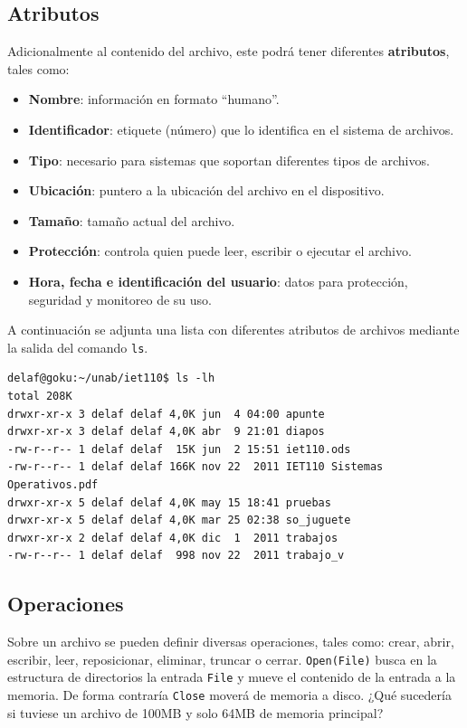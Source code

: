 \subsection{Atributos}

Adicionalmente al contenido del archivo, este podrá tener diferentes
\textbf{atributos}, tales como:

\begin{itemize}
	\item \textbf{Nombre}: información en formato ``humano''.
	\item \textbf{Identificador}: etiquete (número) que lo identifica en el
sistema de archivos.
	\item \textbf{Tipo}: necesario para sistemas que soportan diferentes
tipos de archivos.
	\item \textbf{Ubicación}: puntero a la ubicación del archivo en el
dispositivo.
	\item \textbf{Tamaño}: tamaño actual del archivo.
	\item \textbf{Protección}: controla quien puede leer, escribir o
ejecutar el archivo.
	\item \textbf{Hora, fecha e identificación del usuario}: datos para
protección, seguridad y monitoreo de su uso.
\end{itemize}

A continuación se adjunta una lista con diferentes atributos de archivos
mediante la salida del comando \texttt{ls}.

\begin{verbatim}
delaf@goku:~/unab/iet110$ ls -lh
total 208K
drwxr-xr-x 3 delaf delaf 4,0K jun  4 04:00 apunte
drwxr-xr-x 3 delaf delaf 4,0K abr  9 21:01 diapos
-rw-r--r-- 1 delaf delaf  15K jun  2 15:51 iet110.ods
-rw-r--r-- 1 delaf delaf 166K nov 22  2011 IET110 Sistemas Operativos.pdf
drwxr-xr-x 5 delaf delaf 4,0K may 15 18:41 pruebas
drwxr-xr-x 5 delaf delaf 4,0K mar 25 02:38 so_juguete
drwxr-xr-x 2 delaf delaf 4,0K dic  1  2011 trabajos
-rw-r--r-- 1 delaf delaf  998 nov 22  2011 trabajo_v
\end{verbatim}

\subsection{Operaciones}

Sobre un archivo se pueden definir diversas operaciones, tales como: crear,
abrir, escribir, leer, reposicionar, eliminar, truncar o cerrar.
\texttt{Open(File)} busca en la estructura de directorios la entrada
\texttt{File} y mueve el contenido de la entrada a la memoria. De forma
contraría \texttt{Close} moverá de memoria a disco. ¿Qué sucedería si tuviese un
archivo de 100MB y solo 64MB de memoria principal?

